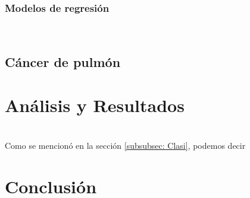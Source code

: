 \documentclass[a4paper, 11pt]{article}
\begin{document}
\begin{multicols}{2}
                    \lipsum[2]\\
                    
                    \lipsum[5] \lipsum[1]
                \subsubsection{Modelos de regresión}\label{subsubsec: Reg}
                    \lipsum[9]\\
                    
                    \lipsum[7] \lipsum[2]
                    
            \subsection{Cáncer de pulmón}\label{subsec: Cancer}
                \lipsum[1]
            
        \section{Análisis y Resultados}\label{sec: A y R}
            \lipsum \\
            
            Como se mencionó en la sección \ref{subsubsec: Clasi}, podemos decir 
    
        \section{Conclusión}\label{sec: Conclu}
            \lipsum[9] \lipsum[8]
    \end{multicols}
    
    
    
    
    
        
\end{document}
